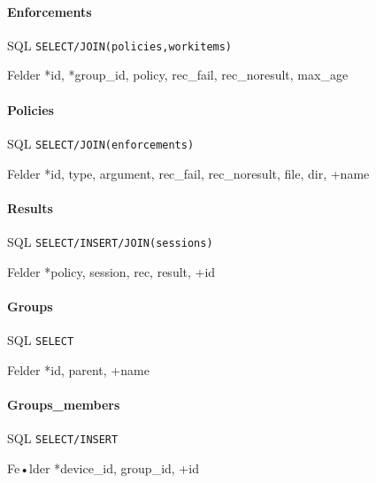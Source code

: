 \documentclass[10pt,a4paper]{scrartcl}
\begin{document}
\paragraph{Enforcements}
\begin{description*}
	\item[SQL] \texttt{SELECT/JOIN(policies,workitems)}
	\item[Felder] *id, *group\_id, policy, rec\_fail, rec\_noresult, max\_age
\end{description*}

\paragraph{Policies}
\begin{description*}
	\item[SQL] \texttt{SELECT/JOIN(enforcements)}
	\item[Felder] *id, type, argument, rec\_fail, rec\_noresult, file, dir, +name
\end{description*}

\paragraph{Results}
\begin{description*}
	\item[SQL] \texttt{SELECT/INSERT/JOIN(sessions)}
	\item[Felder] *policy, session, rec, result, +id
\end{description*}

\paragraph{Groups}
\begin{description*}
	\item[SQL] \texttt{SELECT}
	\item[Felder] *id, parent, +name
\end{description*}

\paragraph{Groups\_members}
\begin{description*}
	\item[SQL] \texttt{SELECT/INSERT}
	\item[Fe•lder] *device\_id, group\_id, +id
\end{description*}
\end{document}

